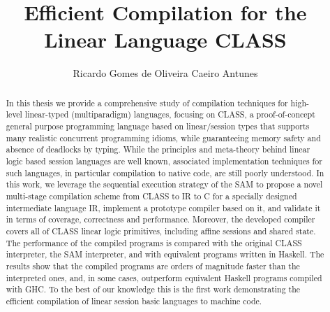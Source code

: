 \documentclass[sigconf,nonacm,natbib=true]{acmart}
\begin{document}

\title{Efficient Compilation for the Linear Language CLASS}

\author{Ricardo Gomes de Oliveira Caeiro Antunes}

\renewcommand{\shortauthors}{Ricardo Antunes}

\begin{abstract}
In this thesis we provide a comprehensive study of compilation techniques for high-level linear-typed (multiparadigm) languages, focusing on \ac{CLASS}, a proof-of-concept general purpose programming language based on linear/session types that supports many realistic concurrent programming idioms, while guaranteeing memory safety and  absence of deadlocks by typing.
While the principles and meta-theory behind linear logic based session languages are well known, associated implementation techniques for such languages, in particular compilation to native code, are still poorly understood. In this work, we leverage the sequential execution strategy of the \ac{SAM} to propose a novel multi-stage compilation scheme from CLASS to IR to C for a specially designed intermediate language IR,
implement a prototype compiler based on it, and validate it in terms of coverage, correctness and performance. Moreover, the developed compiler covers all of CLASS linear logic primitives, including affine sessions and shared state.  The performance of the compiled programs is compared with the original CLASS interpreter, the SAM interpreter, and with equivalent programs written in Haskell. The results show that the compiled programs are orders of magnitude faster than the interpreted ones, and, in some cases, outperform equivalent Haskell programs compiled with GHC. To the best of our knowledge this is the first work demonstrating the efficient compilation of linear session basic languages to machine code.
\end{abstract}
\end{document}

